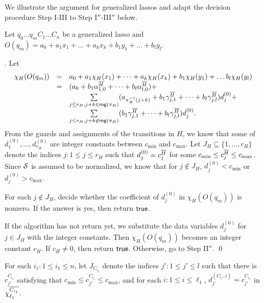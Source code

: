 \begin{appendix}
We illustrate the argument for generalized lassos and adapt the decision procedure Step I-III to Step I$''$-III$''$ below.

Let $q_0 \dots q_m C_1 \dots C_n$ be a generalized lasso and $O(q_m)=a_0 + a_1 x_1 + \dots + a_k x_k + b_1 y_1 + \dots + b_l y_l$.

\smallskip

. Let
\[
\begin{array}{l c l }
\chi_H(O(q_m)) & = & a_0 + a_1 \chi_H(x_1) + \dots + a_k \chi_H(x_k) + b_1 \chi_H(y_1) + \dots b_l \chi_H(y_l) \\
& = & (a_0+b_1 \alpha^{\overline{H}}_{1,0} + \dots + b_l \alpha^{\overline{H}}_{l,0}) + \\
& & \sum \limits_{j \le r_H, j+k \in \mathsf{rng}(\pi_H)} (a_{\pi_H^{-1}(j+k)}+ b_1 \gamma^{\overline{H}}_{j,1}+\dots + b_l \gamma^{\overline{H}}_{j,l}) d^{(0)}_j +
\\
& & \sum \limits_{j \le r_H, j +k \not \in \mathsf{rng}(\pi_H)}  (b_1 \gamma^{\overline{H}}_{j,1}+\dots + b_l \gamma^{\overline{H}}_{j,l}) d^{(0)}_j .
\end{array}
\]
From the guards and assignments of the transitions in $H$, we know that some of $d^{(0)}_1,\dots,d^{(0)}_{r_H}$ are integer constants between $c_{\min}$ and $c_{\max}$. Let $J_H \subseteq \{1,\dots, r_H\}$ denote the indices $j: 1 \le j \le r_H$ such that $d^{(0)}_j = c^{\overline{H}}_j$ for some $c_{\min}\le c^{\overline{H}}_j \le c_{\max}$. Since ${\mathcal{S} }$ is assumed to be normalized, we know that for $j \not \in J_H$,  $d^{(0)}_j < c_{\min}$ or $d^{(0)}_j > c_{\max}$.

For each $j \not \in J_H$, decide whether the coefficient of $d^{(0)}_j$ in $\chi_H(O(q_m))$ is nonzero. If the answer is yes, then return $\mathsf{true}$. 

If the algorithm has not return yet, we substitute the data variables $d^{(0)}_j$ for $j \in J_H$ with the integer constants. Then $\chi_H(O(q_m))$ becomes an integer constant $c_H$. If $c_H \neq 0$, then return $\mathsf{true}$.  Otherwise, go to Step II$''$. \qed

\medskip

For each $i_1: 1 \le i_1 \le n$, let $J_{C_{i_1}}$ denote the indices $j': 1 \le j' \le l$ such that there is $c^{C_{i_1}}_{j'}$ satisfying that $c_{\min} \le c^{C_{i_1}}_{j'} \le c_{\max}$, and for each $i: 1 \le i \le \ell_1$, $d^{(C_{i_1},i)}_{j'}=c^{C_{i_1}}_{j'}$ in $\chi^{\overline{C_{i_1}}}_{\ell_1}$. 


\end{appendix}
